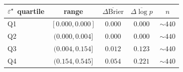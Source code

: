 \begin{tabular}{@{}lcccc@{}}
\toprule
$\varepsilon^\star$ quartile & range            & $\overline{\Delta\mathrm{Brier}}$ & $\overline{\Delta\log p}$ & $n$       \\
\midrule
Q1                    & $[0.000, 0.000]$ & $0.000$ & $0.000$ & $\sim 440$ \\
Q2                    & $(0.000, 0.004]$ & $0.000$ & $0.000$ & $\sim 440$ \\
Q3                    & $(0.004, 0.154]$ & $0.012$ & $0.123$ & $\sim 440$ \\
Q4                    & $(0.154, 0.545]$ & $0.054$ & $0.221$ & $\sim 440$ \\
\bottomrule
\end{tabular}
